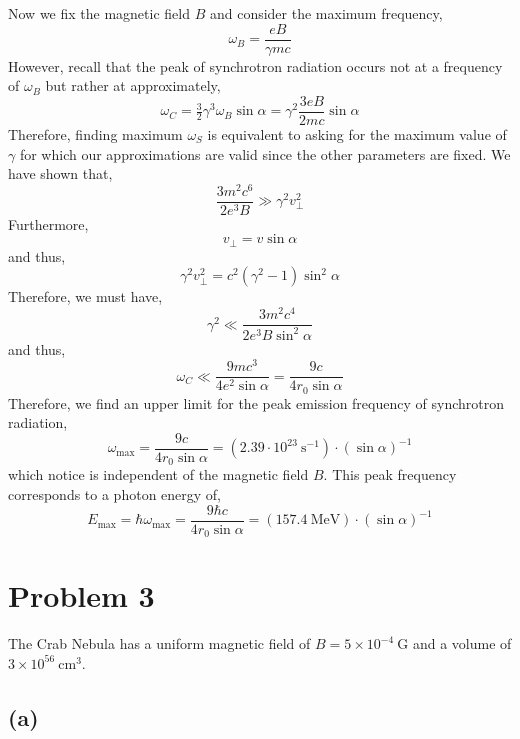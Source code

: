 \documentclass[12pt]{article}
\begin{document}
Now we fix the magnetic field $B$ and consider the maximum frequency,
\[ \omega_B = \frac{e B}{\gamma m c} \]
However, recall that the peak of synchrotron radiation occurs not at a frequency of $\omega_B$ but rather at approximately,
\[ \omega_C = \tfrac{3}{2} \gamma^3 \omega_B \sin{\alpha} = \gamma^2 \frac{3 e B}{2m c} \sin{\alpha} \]
Therefore, finding maximum $\omega_S$ is equivalent to asking for the maximum value of $\gamma$ for which our approximations are valid since the other parameters are fixed. We have shown that,
\[ \frac{3 m^2 c^6}{2 e^3 B} \gg \gamma^2 v_\perp^2 \]
Furthermore, 
\[ v_\perp = v \sin{\alpha} \]
and thus,
\[ \gamma^2 v_\perp^2 = c^2  (\gamma^2 - 1) \sin^2{\alpha} \]
Therefore, we must have,
\[ \gamma^2 \ll \frac{3 m^2 c^4}{2 e^3 B \sin^2{\alpha}} \]
and thus,
\[ \omega_C \ll \frac{9 m c^3}{4 e^2 \sin{\alpha}} = \frac{9 c}{4 r_0 \sin{\alpha}} \]
Therefore, we find an upper limit for the peak emission frequency of synchrotron radiation,
\[ \omega_{\text{max}} = \frac{9 c}{4 r_0 \sin{\alpha}} = \left( 2.39 \cdot 10^{23} \: \mathrm{s}^{-1} \right) \cdot (\sin{\alpha})^{-1} \]
which notice is independent of the magnetic field $B$. This peak frequency corresponds to a photon energy of,
\[ E_{\text{max}} = \hbar \omega_{\text{max}} = \frac{9 \hbar c}{4 r_0 \sin{\alpha}} = (157.4 \: \mathrm{MeV}) \cdot (\sin{\alpha})^{-1} \] 

\section{Problem 3}

The Crab Nebula has a uniform magnetic field of $B = 5 \times 10^{-4} \: \mathrm{G}$ and a volume of $3 \times 10^{56} \: \mathrm{cm}^3$. 

\subsection*{(a)}
\end{document}
